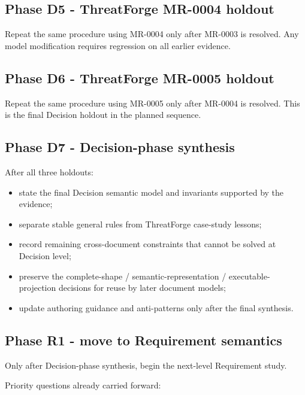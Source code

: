 \documentclass[
  10pt,
]{article}
\providecommand{\tightlist}{%
  \setlength{\itemsep}{0pt}\setlength{\parskip}{0pt}}
\begin{document}
\subsection{Phase D5 - ThreatForge MR-0004
holdout}\label{phase-d5---threatforge-mr-0004-holdout}

Repeat the same procedure using MR-0004 only after MR-0003 is resolved.
Any model modification requires regression on all earlier evidence.

\subsection{Phase D6 - ThreatForge MR-0005
holdout}\label{phase-d6---threatforge-mr-0005-holdout}

Repeat the same procedure using MR-0005 only after MR-0004 is resolved.
This is the final Decision holdout in the planned sequence.

\subsection{Phase D7 - Decision-phase
synthesis}\label{phase-d7---decision-phase-synthesis}

After all three holdouts:

\begin{itemize}
\tightlist
\item
  state the final Decision semantic model and invariants supported by
  the evidence;
\item
  separate stable general rules from ThreatForge case-study lessons;
\item
  record remaining cross-document constraints that cannot be solved at
  Decision level;
\item
  preserve the complete-shape / semantic-representation /
  executable-projection decisions for reuse by later document models;
\item
  update authoring guidance and anti-patterns only after the final
  synthesis.
\end{itemize}

\subsection{Phase R1 - move to Requirement
semantics}\label{phase-r1---move-to-requirement-semantics}

Only after Decision-phase synthesis, begin the next-level Requirement
study.

Priority questions already carried forward:
\end{document}
